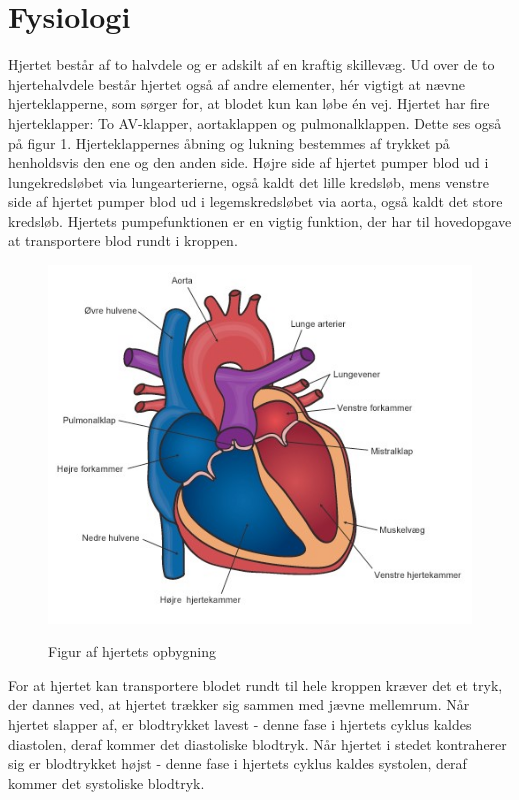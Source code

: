 \section{Fysiologi}

Hjertet består af to halvdele og er adskilt af en kraftig skillevæg. Ud over de to hjertehalvdele
består hjertet også af andre elementer, hér vigtigt at nævne hjerteklapperne, som sørger for,
at blodet kun kan løbe én vej. Hjertet har fire hjerteklapper: To AV-klapper, aortaklappen og
pulmonalklappen. Dette ses også på figur 1. Hjerteklappernes åbning og lukning bestemmes af trykket på henholdsvis den ene og den anden side. Højre side af hjertet pumper blod ud i lungekredsløbet via lungearterierne, også kaldt det lille kredsløb, mens venstre side af hjertet pumper blod ud i legemskredsløbet via aorta, også kaldt det store kredsløb. Hjertets pumpefunktionen er en vigtig funktion, der har til hovedopgave at transportere blod rundt i kroppen.

\begin{figure}[h!]
	\centering
	\includegraphics[width=0.5\linewidth]{Teori/Fysiologi/hjerte}
	\label{fig:hjerte}
	\caption{Figur af hjertets opbygning \cite{Hjerte}}
\end{figure}

For at hjertet kan transportere blodet rundt til hele kroppen kræver det et tryk, der dannes
ved, at hjertet trækker sig sammen med jævne mellemrum. Når hjertet slapper af, er blodtrykket
lavest - denne fase i hjertets cyklus kaldes diastolen, deraf kommer det diastoliske blodtryk. Når
hjertet i stedet kontraherer sig er blodtrykket højst - denne fase i hjertets cyklus kaldes systolen,
deraf kommer det systoliske blodtryk. 


